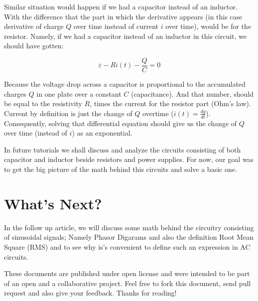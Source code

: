 \documentclass{article}
\begin{document}
	Similar situation would happen if we had a capacitor instead of an inductor. With the difference that the part in which the derivative appears (in this case derivative of charge $Q$ over time instead of current $i$ over time), would be for the resistor. Namely, if we had a capacitor instead of an inductor in this circuit, we should have gotten:
	
	$$\varepsilon - Ri(t) - \frac{Q}{C} = 0 $$
	
	Because the voltage drop across a capacitor is proportional to the accumulated charges $Q$ in one plate over a constant $C$ (capacitance). And that number, should be equal to the resistivity  $R$, times the current for the resistor part (Ohm's law). Current by definition is just the change of $Q$ overtime ($i(t) = \frac{dq}{dt}$). Consequently, solving that differential equation should give us the change of $Q$ over time (instead of $i$) as an exponential.
	
	In future tutorials we shall discuss and analyze the circuits consisting of both capacitor and inductor beside resistors and power supplies. For now, our goal was to get the big picture of the math behind this circuits and solve a basic one.
	
	\section{What's Next?}
	In the follow up article, we will discuss some math behind the circuitry consisting of sinusoidal signals; Namely Phasor Digarams and also the definition Root Mean Square (RMS) and to see why is's convenient to define such an expression in AC circuits.
	
	These documents are published under open license and were intended to be part of an open and a collaborative project. Feel free to fork this document, send pull request and also give your feedback. Thanks for reading!
	
\end{document}
